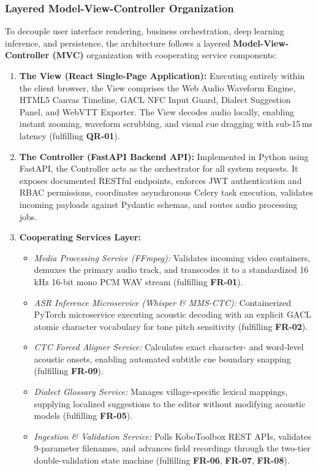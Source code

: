 \documentclass[a4paper,11pt]{article}
\begin{document}
\subsubsection{Layered Model-View-Controller Organization}
\label{sec:chap3_arch_mvc}
To decouple user interface rendering, business orchestration, deep learning inference, and persistence, the architecture follows a layered \textbf{Model-View-Controller (MVC)} organization with cooperating service components:
\begin{enumerate}
    \item \textbf{The View (React Single-Page Application):} Executing entirely within the client browser, the View comprises the Web Audio Waveform Engine, HTML5 Canvas Timeline, GACL NFC Input Guard, Dialect Suggestion Panel, and WebVTT Exporter. The View decodes audio locally, enabling instant zooming, waveform scrubbing, and visual cue dragging with sub-15\,ms latency (fulfilling \textbf{QR-01}).
    \item \textbf{The Controller (FastAPI Backend API):} Implemented in Python using FastAPI, the Controller acts as the orchestrator for all system requests. It exposes documented RESTful endpoints, enforces JWT authentication and RBAC permissions, coordinates asynchronous Celery task execution, validates incoming payloads against Pydantic schemas, and routes audio processing jobs.
    \item \textbf{Cooperating Services Layer:}
    \begin{itemize}
        \item \textit{Media Processing Service (FFmpeg):} Validates incoming video containers, demuxes the primary audio track, and transcodes it to a standardized 16\,kHz 16-bit mono PCM WAV stream (fulfilling \textbf{FR-01}).
        \item \textit{ASR Inference Microservice (Whisper \& MMS-CTC):} Containerized PyTorch microservice executing acoustic decoding with an explicit GACL atomic character vocabulary for tone pitch sensitivity (fulfilling \textbf{FR-02}).
        \item \textit{CTC Forced Aligner Service:} Calculates exact character- and word-level acoustic onsets, enabling automated subtitle cue boundary snapping (fulfilling \textbf{FR-09}).
        \item \textit{Dialect Glossary Service:} Manages village-specific lexical mappings, supplying localized suggestions to the editor without modifying acoustic models (fulfilling \textbf{FR-05}).
        \item \textit{Ingestion \& Validation Service:} Polls KoboToolbox REST APIs, validates 9-parameter filenames, and advances field recordings through the two-tier double-validation state machine (fulfilling \textbf{FR-06}, \textbf{FR-07}, \textbf{FR-08}).

\end{itemize}
\end{enumerate}
\end{document}
